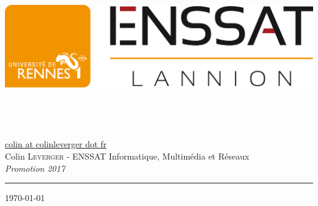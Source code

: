\begin{titlepage}
  \begin{sffamily}
  \begin{center}

	\href{http://enssat.fr}{\includegraphics[scale=0.2]{images/logo_ecole.png}}\\[1.5cm]

    \textsc{\Large\quelrapport}\\[1.5cm]

    \HRule \\[1cm]
    { \titre\\[1cm] }
    \HRule \\[1.5cm]

    \large
        \href{mailto:colin@colinleverger.fr}{colin \lbrack{}at\rbrack{} colinleverger \lbrack{}dot\rbrack{} fr}\\[0.5cm]
        Colin \textsc{Leverger} -
        ENSSAT Informatique, Multimédia et Réseaux \\
        \emph{Promotion 2017}
        \skipduhaut
    \rule{\linewidth}{0.2mm}
    \dest
    \vfill

    \today

  \end{center}
  \end{sffamily}
\end{titlepage}
